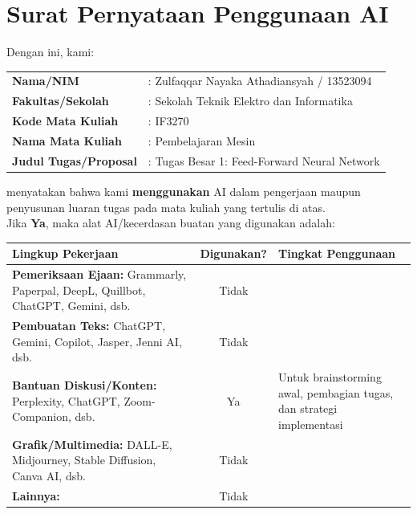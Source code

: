 \section{Surat Pernyataan Penggunaan AI}

Dengan ini, kami: \\[.5em]
    \begin{tabular}{ll}
        \textbf{Nama/NIM} & : Zulfaqqar Nayaka Athadiansyah / 13523094 \\
        \textbf{Fakultas/Sekolah} & : Sekolah Teknik Elektro dan Informatika \\
        \textbf{Kode Mata Kuliah} & : IF3270 \\
        \textbf{Nama Mata Kuliah} & : Pembelajaran Mesin \\
        \textbf{Judul Tugas/Proposal} & : Tugas Besar 1: Feed-Forward Neural Network \\
    \end{tabular}

\vspace{0.5cm}

\noindent menyatakan bahwa kami \textbf{menggunakan} AI dalam pengerjaan maupun penyusunan luaran tugas pada mata kuliah yang tertulis di atas. \\

\noindent Jika \textbf{Ya}, maka alat AI/kecerdasan buatan yang digunakan adalah:

\vspace{0.1cm}

\begin{table}[H]
    \centering
    \small
    \renewcommand{\arraystretch}{1.5}
    \begin{tabular}{|L{7cm}|c|L{4cm}|}
        \hline
        \textbf{Lingkup Pekerjaan} & \textbf{Digunakan?} & \textbf{Tingkat Penggunaan} \\ \hline
        \textbf{Pemeriksaan Ejaan:} Grammarly, Paperpal, DeepL, Quillbot, ChatGPT, Gemini, dsb. & Tidak & \\ \hline
        \textbf{Pembuatan Teks:} ChatGPT, Gemini, Copilot, Jasper, Jenni AI, dsb. & Tidak & \\ \hline
        \textbf{Bantuan Diskusi/Konten:} Perplexity, ChatGPT, Zoom-Companion, dsb. & Ya & Untuk brainstorming awal, pembagian tugas, dan strategi implementasi \\ \hline
        \textbf{Grafik/Multimedia:} DALL-E, Midjourney, Stable Diffusion, Canva AI, dsb. & Tidak & \\ \hline
        \textbf{Lainnya:} & Tidak & \\ \hline
    \end{tabular}
\end{table}

